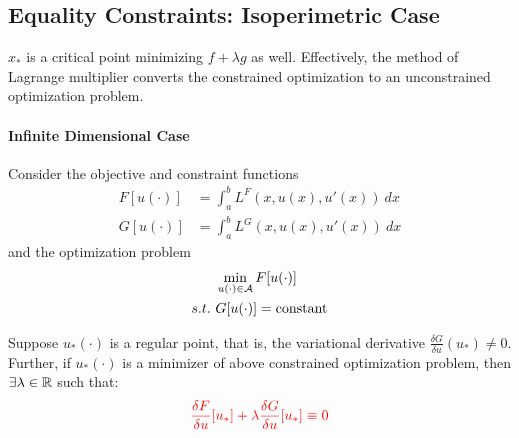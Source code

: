 \documentclass{article}
\begin{document}
	\subsection{Equality Constraints: Isoperimetric Case}
	\begin{remark}
		$x_*$ is a critical point minimizing $f + \lambda g$ as well. Effectively, the method of Lagrange multiplier converts the constrained optimization to an unconstrained optimization problem.
	\end{remark}
	
	\paragraph{Infinite Dimensional Case} Consider the objective and constraint functions
	\begin{align}
		F[u(\cdot)] &= \int_a^b L^F(x, u(x), u'(x))\ dx \\
		G[u(\cdot)] &= \int_a^b L^G(x, u(x), u'(x))\ dx
	\end{align}
	and the optimization problem
	\begin{align}
		&\min_{u(\cdot) \in \mathcal{{A}}} F[u(\cdot)] \\
		s.t.\ &G[u(\cdot)] = \text{{constant}}
	\end{align}

	\begin{theorem}
		Suppose $u_*(\cdot)$ is a regular point, that is, the variational derivative $\frac{\delta G}{\delta u}(u_*) \neq 0$.\\
		Further, if $u_*(\cdot)$ is a minimizer of above constrained optimization problem, then $\exists \lambda \in \mathbb{R}$ such that:
		\begin{align}
			\textcolor{red}{\frac{\delta F}{\delta u}[u_*] + \lambda \frac{\delta G}{\delta u}[u_*] \equiv 0}
		\end{align}
	\end{theorem}
\end{document}
